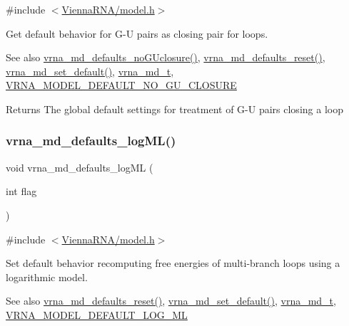 {\ttfamily \#include $<$\hyperlink{model_8h}{Vienna\+R\+N\+A/model.\+h}$>$}



Get default behavior for G-\/U pairs as closing pair for loops. 

\begin{DoxySeeAlso}{See also}
\hyperlink{group__model__details_gade5b9951d71ca2fb357a4e6c0c18ccd1}{vrna\+\_\+md\+\_\+defaults\+\_\+no\+G\+Uclosure()}, \hyperlink{group__model__details_ga70834424cf804d149937de89f80ceb45}{vrna\+\_\+md\+\_\+defaults\+\_\+reset()}, \hyperlink{group__model__details_ga8ac6ff84936282436f822644bf841f66}{vrna\+\_\+md\+\_\+set\+\_\+default()}, \hyperlink{group__model__details_ga1f8a10e12a0a1915f2a4eff0b28ea17c}{vrna\+\_\+md\+\_\+t}, \hyperlink{group__model__details_ga5308de46faaca4b9fd16045864901ee7}{V\+R\+N\+A\+\_\+\+M\+O\+D\+E\+L\+\_\+\+D\+E\+F\+A\+U\+L\+T\+\_\+\+N\+O\+\_\+\+G\+U\+\_\+\+C\+L\+O\+S\+U\+RE} 
\end{DoxySeeAlso}
\begin{DoxyReturn}{Returns}
The global default settings for treatment of G-\/U pairs closing a loop 
\end{DoxyReturn}
\mbox{\label{group__model__details_ga3de50a73455d88c3957386933b8e1f90}} 
\subsubsection{\texorpdfstring{vrna\+\_\+md\+\_\+defaults\+\_\+log\+M\+L()}{vrna\_md\_defaults\_logML()}}
{\footnotesize\ttfamily void vrna\+\_\+md\+\_\+defaults\+\_\+log\+ML (\begin{DoxyParamCaption}\item[{int}]{flag }\end{DoxyParamCaption})}



{\ttfamily \#include $<$\hyperlink{model_8h}{Vienna\+R\+N\+A/model.\+h}$>$}



Set default behavior recomputing free energies of multi-\/branch loops using a logarithmic model. 

\begin{DoxySeeAlso}{See also}
\hyperlink{group__model__details_ga70834424cf804d149937de89f80ceb45}{vrna\+\_\+md\+\_\+defaults\+\_\+reset()}, \hyperlink{group__model__details_ga8ac6ff84936282436f822644bf841f66}{vrna\+\_\+md\+\_\+set\+\_\+default()}, \hyperlink{group__model__details_ga1f8a10e12a0a1915f2a4eff0b28ea17c}{vrna\+\_\+md\+\_\+t}, \hyperlink{group__model__details_ga938f68463e84fe060aa6502f428a517d}{V\+R\+N\+A\+\_\+\+M\+O\+D\+E\+L\+\_\+\+D\+E\+F\+A\+U\+L\+T\+\_\+\+L\+O\+G\+\_\+\+ML} 
\end{DoxySeeAlso}

